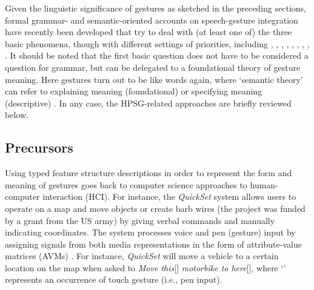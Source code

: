 \documentclass[output=paper]{langsci/langscibook}
\begin{document}
Given the linguistic significance of gestures as sketched in the preceding sections, formal grammar- and semantic-oriented accounts on speech-gesture integration have recently been developed that try to deal with (at least one of) the three basic phenomena, though with different settings of priorities, including
%
\citet{Alahverdzhieva:2013}, %
%
\citet{Alahverdzhieva:Lascarides:2010},
%
\cite{Ebert:2014:a},
%
\citet{Giorgolo:2010},
%
\citet{Giorgolo:Asudeh:2011},
%
\citet{Luecking:2013:a,Luecking:2016},
%
\citet{Rieser:2008,Rieser:2011,Rieser:2015},
%
\citet{Rieser:Poesio:2009},
%
\citet{Schlenker:2018}.
%
It should be noted that the first basic question does not have to be considered a question for grammar, but can be delegated to a foundational theory of gesture meaning.
%
Here gestures turn out to be like words again, where \enquote*{semantic theory} can refer to explaining meaning (foundational) or specifying meaning (descriptive) \citep[]{Lewis:1970}.
%
In any case, the HPSG-related approaches are briefly reviewed below.
%



\subsection{Precursors} 
\label{sec:precursors}

Using typed feature structure descriptions in order to represent the form and meaning of gestures goes back to computer science approaches to human-computer interaction (HCI). %
%
For instance, the \textit{QuickSet} system  \citep{Cohen:et:al:1997} allows users to operate on a map and move objects or create barb wires (the project was funded by a grant from the US army) by giving verbal commands and manually indicating coordinates.
%
The system processes voice and pen (gesture) input by assigning signals from both media representations in the form of attribute-value matrices (AVMs) \citep{Johnston:1998,Johnston:et:al:1997}.
%
For instance, \textit{QuickSet} will move a vehicle to a certain location on the map when asked to \emph{Move this}[\Pointing] \emph{motorbike to here}[\Pointing], where \enquote*{\Pointing} represents an occurrence of touch gesture (i.e., pen input). 
\end{document}
